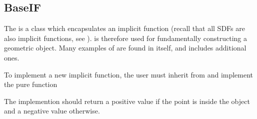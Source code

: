 \documentclass[letterpaper,10pt,english]{sphinxmanual}
\begin{document}
\subsection{BaseIF}
\label{\detokenize{Source/ChomboBasics:baseif}}\label{\detokenize{Source/ChomboBasics:chap-baseif}}
\sphinxAtStartPar
The  is a  class which encapsulates an implicit function (recall that all SDFs are also implicit functions, see {\hyperref[\detokenize{Source/SpatialDiscretization:chap-geometryrepresentation}]{}}).
 is therefore used for fundamentally constructing a geometric object.
Many examples of  are found in  itself, and  includes additional ones.

\sphinxAtStartPar
To implement a new implicit function, the user must inherit from  and implement the pure function

\begin{sphinxVerbatim}[commandchars=\\\{\},formatcom=\scriptsize]
       
\end{sphinxVerbatim}

\sphinxAtStartPar
The implemention should return a positive value if the point  is inside the object and a negative value otherwise.

\sphinxstepscope
\end{document}
